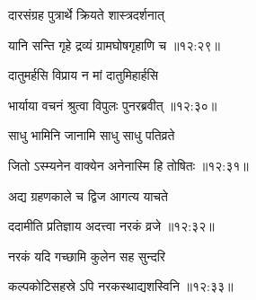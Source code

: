 {\devanagarifont दारसंग्रह पुत्रार्थे क्रियते शास्त्रदर्शनात् \thinspace{\dandab} \dontdisplaylinenum }%


{\devanagarifont यानि सन्ति गृहे द्रव्यं ग्रामघोषगृहाणि च {॥१२:२९॥} \veg\dontdisplaylinenum }%
 
{\devanagarifont दातुमर्हसि विप्राय न मां दातुमिहार्हसि \thinspace{\dandab} \dontdisplaylinenum }%
 

{\devanagarifont भार्याया वचनं श्रुत्वा विपुलः पुनरब्रवीत् {॥१२:३०॥} \veg\dontdisplaylinenum }%

{\devanagarifont साधु भामिनि जानामि साधु साधु पतिव्रते \thinspace{\dandab} \dontdisplaylinenum }%


{\devanagarifont जितो ऽस्म्यनेन वाक्येन अनेनास्मि हि तोषितः {॥१२:३१॥} \veg\dontdisplaylinenum }%

{\devanagarifont अद्य ग्रहणकाले च द्विज आगत्य याचते \thinspace{\dandab} \dontdisplaylinenum }%
 

{\devanagarifont ददामीति प्रतिज्ञाय अदत्त्वा नरकं व्रजे {॥१२:३२॥} \veg\dontdisplaylinenum }%

{\devanagarifont नरकं यदि गच्छामि कुलेन सह सुन्दरि \thinspace{\dandab} \dontdisplaylinenum }%


{\devanagarifont कल्पकोटिसहस्रे ऽपि नरकस्थाद्यशस्विनि {॥१२:३३॥} \veg\dontdisplaylinenum }%

